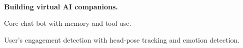 \\
\vspace{-.2em}
\begin{xitemize}
    \item \textbf{Building virtual AI companions.}
    \begin{zitemize}
        \item Core chat bot with memory and tool use.
        \item User's engagement detection with head-pose tracking and emotion detection.
    \end{zitemize}
\end{xitemize}

\\
\vspace{-.2em}
